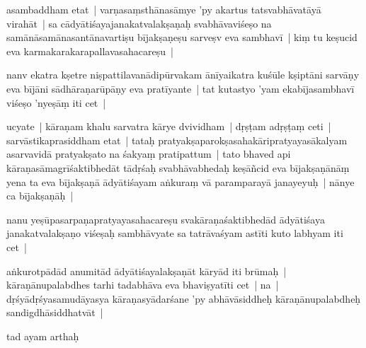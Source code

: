 \documentclass[article,12pt,a4paper]{memoir}%
\newcounter{parCount}
\begin{document}
	  \pstart \leavevmode%
	\label{thakur75-80.23}asambaddham etat | varṇasaṃsthānasāmye 'py akartus tatsvabhāvatāyā virahāt | sa cādyātiśayajanakatvalakṣaṇaḥ svabhāvaviśeṣo na samānāsamānasantānavartiṣu bījakṣaṇeṣu sarveṣv eva sambhavī | kiṃ tu keṣucid eva karmakarakarapallavasahacareṣu |
	{}
	\pend%
      

	  \pstart \leavevmode%
	\label{thakur75-80.26}nanv ekatra kṣetre niṣpattilavanādipūrvakam ānīyaikatra kuśūle kṣiptāni sarvāṇy eva bījāni sādhāraṇarūpāṇy eva pratīyante | tat kutastyo 'yam ekabījasambhavī viśeṣo 'nyeṣāṃ iti cet | 
	{}
	\pend%
      

	  \pstart \leavevmode%
	\label{thakur75-80.28}ucyate | kāraṇam khalu sarvatra kārye dvividham | dṛṣṭam adṛṣṭaṃ ceti | sarvāstikaprasiddham etat | tataḥ pratyakṣaparokṣasahakāripratyayasākalyam asarvavidā pratyakṣato na śakyaṃ pratipattum | tato bhaved api kāraṇasāmagrīśaktibhedāt tādṛśaḥ svabhāvabhedaḥ keṣāñcid eva bījakṣaṇānāṃ yena ta eva bījakṣaṇā ādyātiśayam aṅkuraṃ vā paramparayā janayeyuḥ | nānye ca bījakṣaṇāḥ |
	{}
	\pend%
      

	  \pstart \leavevmode%
	\label{thakur75-81.5}nanu yeṣūpasarpaṇapratyayasahacareṣu svakāraṇaśaktibhedād ādyātiśaya janakatvalakṣaṇo viśeṣaḥ sambhāvyate sa tatrāvaśyam astīti kuto labhyam iti cet | 
	{}
	\pend%
      

	  \pstart \leavevmode%
	\label{thakur75-81.6}aṅkurotpādād anumitād ādyātiśayalakṣaṇāt kāryād iti brūmaḥ | kāraṇānupalabdhes tarhi tadabhāva eva bhaviṣyatīti cet | na | dṛśyādṛśyasamudāyasya kāraṇasyādarśane 'py abhāvāsiddheḥ kāraṇānupalabdheḥ sandigdhāsiddhatvāt |
	{}
	\pend%
      

	  \pstart \leavevmode%
	\label{thakur75-81.9}tad ayam arthaḥ 
	{}
	\pend%
      
\end{document}
